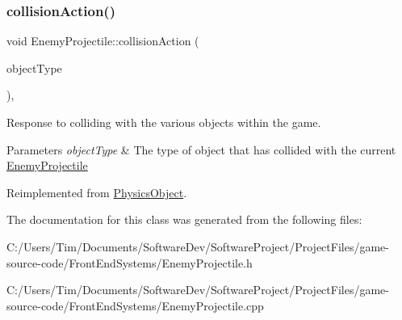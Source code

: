 \subsubsection{\texorpdfstring{collision\+Action()}{collisionAction()}}
{\footnotesize\ttfamily void Enemy\+Projectile\+::collision\+Action (\begin{DoxyParamCaption}\item[{const Game\+Object\+Type \&}]{object\+Type }\end{DoxyParamCaption})\hspace{0.3cm}{\ttfamily [override]}, {\ttfamily [virtual]}}



Response to colliding with the various objects within the game. 


\begin{DoxyParams}{Parameters}
{\em object\+Type} & The type of object that has collided with the current \hyperlink{class_enemy_projectile}{Enemy\+Projectile} \\
\hline
\end{DoxyParams}


Reimplemented from \hyperlink{class_physics_object_a16163f4e5bf781b3814d024c9f44a276}{Physics\+Object}.



The documentation for this class was generated from the following files\+:\begin{DoxyCompactItemize}
\item 
C\+:/\+Users/\+Tim/\+Documents/\+Software\+Dev/\+Software\+Project/\+Project\+Files/game-\/source-\/code/\+Front\+End\+Systems/Enemy\+Projectile.\+h\item 
C\+:/\+Users/\+Tim/\+Documents/\+Software\+Dev/\+Software\+Project/\+Project\+Files/game-\/source-\/code/\+Front\+End\+Systems/Enemy\+Projectile.\+cpp\end{DoxyCompactItemize}
